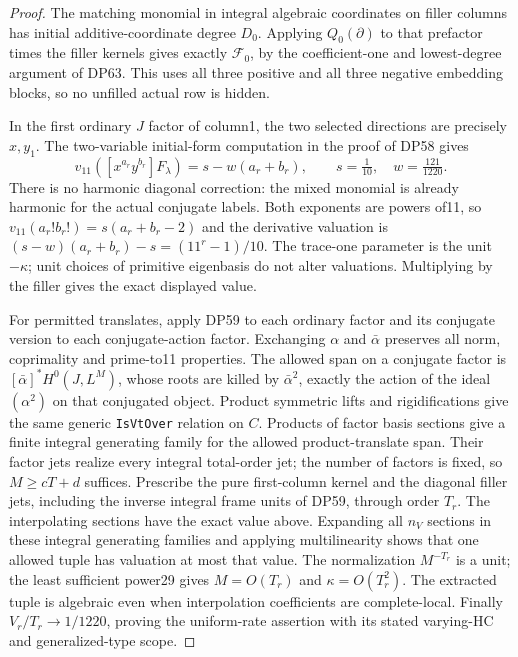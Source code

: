 \documentclass[11pt,a4paper]{article}
\theoremstyle{definition}\newtheorem{remark}[theorem]{Remark}
\begin{document}
\begin{proof}
The matching monomial in integral algebraic coordinates on filler
columns has initial additive-coordinate degree $D_0$. Applying
$Q_0(\partial)$ to that prefactor times the filler kernels gives exactly
$\mathcal F_0$, by the coefficient-one and lowest-degree argument of
DP63. This uses all three positive and all three negative embedding
blocks, so no unfilled actual row is hidden.

In the first ordinary $J$ factor of column1, the two selected directions
are precisely $x,y_1$. The two-variable initial-form computation in the proof of DP58 gives
\[
 v_{11}([x^{a_r}y^{b_r}]F_\lambda)=s-w(a_r+b_r),
 \qquad s=\tfrac1{10},\quad w=\tfrac{121}{1220}.
\]
There is no harmonic diagonal correction: the mixed monomial is already
harmonic for the actual conjugate labels. Both exponents are powers of11,
so $v_{11}(a_r!b_r!)=s(a_r+b_r-2)$ and the derivative valuation is
$(s-w)(a_r+b_r)-s=(11^r-1)/10$. The trace-one parameter is the unit
$-\kappa$; unit choices of primitive eigenbasis do not alter valuations.
Multiplying by the filler gives the exact displayed value.

For permitted translates, apply DP59 to each ordinary factor and its
conjugate version to each conjugate-action factor. Exchanging
$\alpha$ and $\bar\alpha$ preserves all norm, coprimality and prime-to11
properties. The allowed span on a conjugate factor is
$[\bar\alpha]^*H^0(J,L^M)$, whose roots are killed by
$\bar\alpha^2$, exactly the action of the ideal $(\alpha^2)$ on that
conjugated object. Product symmetric lifts and rigidifications give the
same generic \texttt{IsVtOver} relation on $C$.
Products of factor basis sections give a finite integral generating family
for the allowed product-translate span. Their factor jets realize every
integral total-order jet; the number of factors is fixed, so $M\ge cT+d$ suffices.
Prescribe the pure first-column kernel and the diagonal filler jets,
including the inverse integral frame units of DP59, through order $T_r$.
The interpolating sections have the exact value above. Expanding all
$n_V$ sections in these integral generating families and applying multilinearity
shows that one allowed tuple has valuation at most that value.
The normalization $M^{-T_r}$ is a unit; the least sufficient power29
gives $M=O(T_r)$ and $\kappa=O(T_r^2)$. The extracted tuple is algebraic
even when interpolation coefficients are complete-local.
Finally $V_r/T_r\to1/1220$, proving the uniform-rate assertion with
its stated varying-HC and generalized-type scope.
\end{proof}
\end{document}
